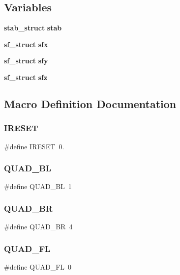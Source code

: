 \subsection*{Variables}
\begin{DoxyCompactItemize}
\item 
\textbf{ stab\+\_\+struct} \textbf{ stab}
\item 
\textbf{ sf\+\_\+struct} \textbf{ sfx}
\item 
\textbf{ sf\+\_\+struct} \textbf{ sfy}
\item 
\textbf{ sf\+\_\+struct} \textbf{ sfz}
\end{DoxyCompactItemize}


\subsection{Macro Definition Documentation}
\mbox{\label{stab_8h_a0cc4cba26cb2a75b21232c626e26ce74}} 
\subsubsection{I\+R\+E\+S\+ET}
{\footnotesize\ttfamily \#define I\+R\+E\+S\+ET~0.}

\mbox{\label{stab_8h_a49167dd27955411c6cc85fed1180356d}} 
\subsubsection{Q\+U\+A\+D\+\_\+\+BL}
{\footnotesize\ttfamily \#define Q\+U\+A\+D\+\_\+\+BL~1}

\mbox{\label{stab_8h_a316499551e72063318dc593b26aff28b}} 
\subsubsection{Q\+U\+A\+D\+\_\+\+BR}
{\footnotesize\ttfamily \#define Q\+U\+A\+D\+\_\+\+BR~4}

\mbox{\label{stab_8h_a03f9f54020fddfd68ed98990949be039}} 
\subsubsection{Q\+U\+A\+D\+\_\+\+FL}
{\footnotesize\ttfamily \#define Q\+U\+A\+D\+\_\+\+FL~0}

